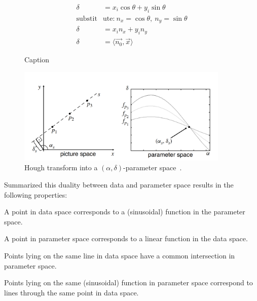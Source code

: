 \begin{align}
    \delta &= x_i \cos{\theta} + y_i \sin{\theta}\nonumber\\
    \text{substit}&\text{ute:}\ n_x = \cos{\theta},\ n_y = \sin{\theta} \nonumber\\
    \delta &= x_i n_x + y_i n_y\nonumber\\
    \label{eq:hnfunv}
    \delta &= \langle\vec{n_0},\vec{x}\rangle 
\end{align}

\begin{figure}
    \centering
    \caption{Caption}
    \label{fig:hnf_euclid}
\end{figure}

\begin{figure}
    \centering
    \includegraphics[width=0.9\textwidth]{figures/TODOHOUGHTHETADIST.png}
    \caption{Hough transform into a $(\alpha,\delta)$-parameter space~\cite{CASHachtert2008global}.}
    \label{fig:TODOHOUGH}
\end{figure}

Summarized this duality between data and parameter space results in the following properties:\label{ssec:properties}
\begin{property}\label{prop:hough1}
A point in data space corresponds to a (sinusoidal) function in the parameter space. 
\end{property}
\begin{property}\label{prop:hough2}
A point in parameter space corresponds to a linear function in the data space.
\end{property}
\begin{property}\label{prop:hough3}
Points lying on the same line in data space have a common intersection in parameter space.
\end{property}
\begin{property}\label{prop:hough4}
Points lying on the same (sinusoidal) function in parameter space correspond to lines through the same point in data space.
\end{property}

